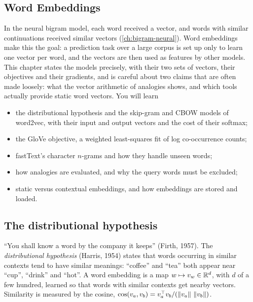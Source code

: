 \begin{notechapter}
\chapter{Word Embeddings}\label{ch:word-embeddings}

\begin{chapterintro}
In the neural bigram model, each word received a vector, and words with similar
continuations received similar vectors (\cref{ch:bigram-neural}). Word embeddings make this
the goal: a prediction task over a large corpus is set up only to learn one vector per word,
and the vectors are then used as features by other models. This chapter states the
models precisely, with their two sets of vectors, their objectives and their gradients,
and is careful about two claims that are often made loosely: what the vector arithmetic of
analogies shows, and which tools actually provide static word vectors. You will learn
\begin{itemize}[nosep]
  \item the distributional hypothesis and the skip-gram and CBOW models of word2vec, with
        their input and output vectors and the cost of their softmax;
  \item the GloVe objective, a weighted least-squares fit of log co-occurrence counts;
  \item fastText's character $n$-grams and how they handle unseen words;
  \item how analogies are evaluated, and why the query words must be excluded;
  \item static versus contextual embeddings, and how embeddings are stored and loaded.
\end{itemize}
\end{chapterintro}

\section{The distributional hypothesis}\label{word-embeddings:sec:distributional}

``You shall know a word by the company it keeps'' (Firth, 1957). The \emph{distributional
hypothesis} (Harris, 1954) states that words occurring in similar contexts tend to have
similar meanings: ``coffee'' and ``tea'' both appear near ``cup'', ``drink'' and ``hot''. A word
embedding is a map $w\mapsto v_w\in\mathbb{R}^d$, with $d$ of a few hundred, learned so that words with similar
contexts get nearby vectors. Similarity is measured by the cosine,
$\cos(v_a, v_b) = v_a^\top v_b/(\left\|v_a\right\|\,\left\|v_b\right\|)$.


\end{notechapter}
